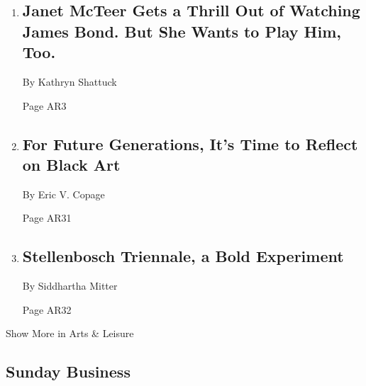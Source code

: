 \begin{enumerate}
\def\labelenumi{\arabic{enumi}.}
\item
  \href{/2020/03/24/arts/television/janet-mcteer-favorites.html}{}

  \hypertarget{janet-mcteer-gets-a-thrill-out-of-watching-james-bond-but-she-wants-to-play-him-too}{%
  \subsection{Janet McTeer Gets a Thrill Out of Watching James Bond. But
  She Wants to Play Him,
  Too.}\label{janet-mcteer-gets-a-thrill-out-of-watching-james-bond-but-she-wants-to-play-him-too}}

  By Kathryn Shattuck

  Page AR3
\item
  \href{/2020/03/19/arts/black-art-reflections.html}{}

  \hypertarget{for-future-generations-its-time-to-reflect-on-black-art}{%
  \subsection{For Future Generations, It's Time to Reflect on Black
  Art}\label{for-future-generations-its-time-to-reflect-on-black-art}}

  By Eric V. Copage

  Page AR31
\item
  \href{/2020/03/25/arts/design/stellenbosch-triennale.html}{}

  \hypertarget{stellenbosch-triennale-a-bold-experiment}{%
  \subsection{Stellenbosch Triennale, a Bold
  Experiment}\label{stellenbosch-triennale-a-bold-experiment}}

  By Siddhartha Mitter

  Page AR32
\end{enumerate}

Show More in Arts \& Leisure

\hypertarget{sunday-business}{%
\subsection{Sunday Business}\label{sunday-business}}

